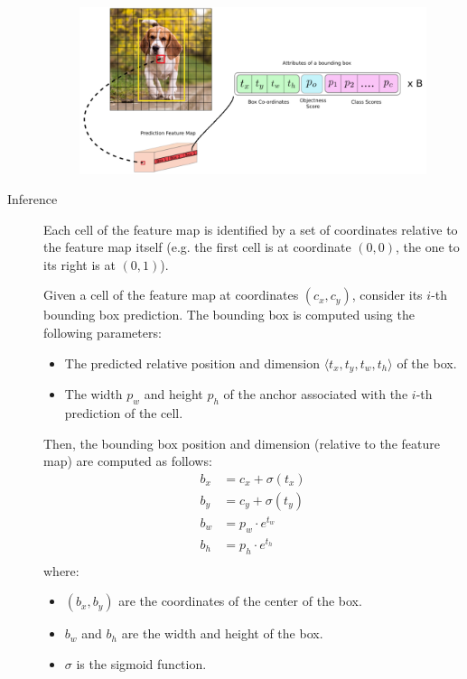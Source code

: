 \begin{description}
        \begin{figure}[H]
            \centering
            \includegraphics[width=0.6\linewidth]{./img/yolo_architecture.png}
        \end{figure}


    \item[Inference] 
        \begin{remark}
            Each cell of the feature map is identified by a set of coordinates relative to the feature map itself 
            (e.g. the first cell is at coordinate $(0,0)$, the one to its right is at $(0, 1)$).    
        \end{remark}

        Given a cell of the feature map at coordinates $(c_x, c_y)$, consider its $i$-th bounding box prediction.
        The bounding box is computed using the following parameters:
        \begin{itemize}
            \item The predicted relative position and dimension $\langle t_x, t_y, t_w, t_h \rangle$ of the box.
            \item The width $p_w$ and height $p_h$ of the anchor associated with the $i$-th prediction of the cell.
        \end{itemize}
        Then, the bounding box position and dimension (relative to the feature map) are computed as follows:
        \[
            \begin{split}
                b_x &= c_x + \sigma(t_x) \\
                b_y &= c_y + \sigma(t_y) \\
                b_w &= p_w \cdot e^{t_w} \\
                b_h &= p_h \cdot e^{t_h} \\
            \end{split}  
        \]
        where:
        \begin{itemize}
            \item $(b_x, b_y)$ are the coordinates of the center of the box.
            \item $b_w$ and $b_h$ are the width and height of the box.
            \item $\sigma$ is the sigmoid function.
        \end{itemize}


\end{description}
